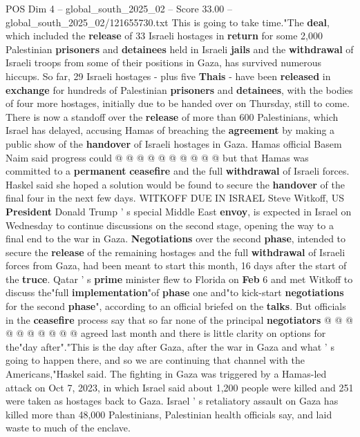 \begin{textsample}{POS Dim 4 – global\_south\_2025\_02 – Score 33.00 – global\_south\_2025\_02/121655730.txt}
This is going to take time."The \textbf{deal}, which included the \textbf{release} of 33 Israeli hostages in \textbf{return} for some 2,000 Palestinian \textbf{prisoners} and \textbf{detainees} held in Israeli \textbf{jails} and the \textbf{withdrawal} of Israeli troops from some of their positions in Gaza, has survived numerous hiccups.
So far, 29 Israeli hostages - plus five \textbf{Thais} - have been \textbf{released} in \textbf{exchange} for hundreds of Palestinian \textbf{prisoners} and \textbf{detainees}, with the bodies of four more hostages, initially due to be handed over on Thursday, still to come.
There is now a standoff over the \textbf{release} of more than 600 Palestinians, which Israel has delayed, accusing Hamas of breaching the \textbf{agreement} by making a public show of the \textbf{handover} of Israeli hostages in Gaza.
Hamas official Basem Naim said progress could @ @ @ @ @ @ @ @ @ @ but that Hamas was committed to a \textbf{permanent} \textbf{ceasefire} and the full \textbf{withdrawal} of Israeli forces.
Haskel said she hoped a solution would be found to secure the \textbf{handover} of the final four in the next few days.
WITKOFF DUE IN ISRAEL Steve Witkoff, US \textbf{President} Donald Trump ' s special Middle East \textbf{envoy}, is expected in Israel on Wednesday to continue discussions on the second stage, opening the way to a final end to the war in Gaza. \textbf{Negotiations} over the second \textbf{phase}, intended to secure the \textbf{release} of the remaining hostages and the full \textbf{withdrawal} of Israeli forces from Gaza, had been meant to start this month, 16 days after the start of the \textbf{truce}.
Qatar ' s \textbf{prime} minister flew to Florida on \textbf{Feb} 6 and met Witkoff to discuss the"full \textbf{implementation}"of \textbf{phase} one and"to kick-start \textbf{negotiations} for the second \textbf{phase}", according to an official briefed on the \textbf{talks}.
But officials in the \textbf{ceasefire} process say that so far none of the principal \textbf{negotiators} @ @ @ @ @ @ @ @ @ @ agreed last month and there is little clarity on options for the"day after"."This is the day after Gaza, after the war in Gaza and what ' s going to happen there, and so we are continuing that channel with the Americans,"Haskel said.
The fighting in Gaza was triggered by a Hamas-led attack on Oct 7, 2023, in which Israel said about 1,200 people were killed and 251 were taken as hostages back to Gaza.
Israel ' s retaliatory assault on Gaza has killed more than 48,000 Palestinians, Palestinian health officials say, and laid waste to much of the enclave.

\end{textsample}
